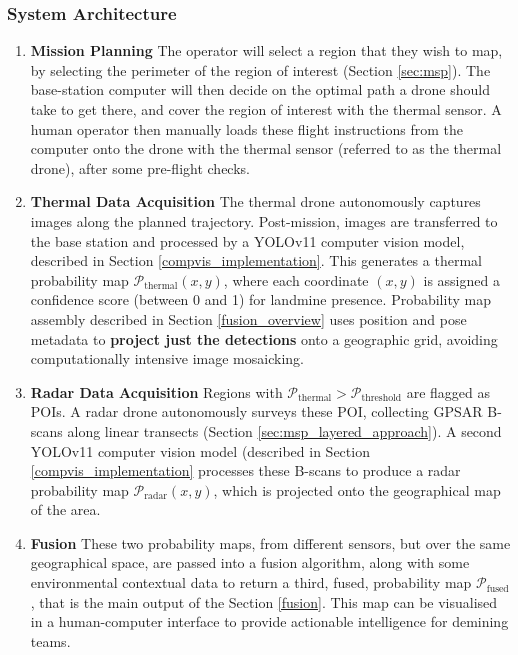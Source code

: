 

    \subsubsection{System Architecture} \label{compvis_methods}
    
        \begin{enumerate}
        
            \item \textbf{Mission Planning} The operator will select a region that they wish to map, by selecting the perimeter of the region of interest (Section \ref{sec:msp}). The base-station computer will then decide on the optimal path a drone should take to get there, and cover the region of interest with the thermal sensor. A human operator then manually loads these flight instructions from the computer onto the drone with the thermal sensor (referred to as the thermal drone), after some pre-flight checks.
            
            \item \textbf{Thermal Data Acquisition} The thermal drone autonomously captures images along the planned trajectory. Post-mission, images are transferred to the base station and processed by a YOLOv11 computer vision model, described in Section \ref{compvis_implementation}. This generates a thermal probability map \newline \(\mathcal{P}_{\text{thermal}}(x,y)\), where each coordinate \((x,y)\) is assigned a confidence score (between 0 and 1) for landmine presence. Probability map assembly described in Section \ref{fusion_overview} uses position and pose metadata to \textbf{project just the detections} onto a geographic grid, avoiding computationally intensive image mosaicking.
            
            \item \textbf{Radar Data Acquisition} Regions with \(\mathcal{P}_{\text{thermal}} > \mathcal{P}_{\text{threshold}}\) are flagged as \gls{POI}s. A radar drone autonomously surveys these \gls{POI}, collecting GPSAR B-scans along linear transects (Section \ref{sec:msp_layered_approach}). A second YOLOv11 computer vision model (described in Section \ref{compvis_implementation} processes these B-scans to produce a radar probability map \(\mathcal{P}_{\text{radar}}(x,y)\), which is projected onto the geographical map of the area.
            
            \item \textbf{Fusion} These two probability maps, from different sensors, but over the same geographical space, are passed into a fusion algorithm, along with some environmental contextual data to return a third, fused, probability map $\mathcal{P}_{\text{fused}}$, that is the main output of the Section \ref{fusion}. This map can be visualised in a human-computer interface to provide actionable intelligence for demining teams.
            
        \end{enumerate}


